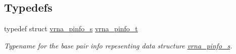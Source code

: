 \subsection*{Typedefs}
\begin{DoxyCompactItemize}
\item 
\mbox{\label{group__aln__utils_ga6660dfca23debee7306e0cd53341263f}} 
typedef struct \mbox{\hyperlink{group__aln__utils_structvrna__pinfo__s}{vrna\+\_\+pinfo\+\_\+s}} \mbox{\hyperlink{group__aln__utils_ga6660dfca23debee7306e0cd53341263f}{vrna\+\_\+pinfo\+\_\+t}}
\begin{DoxyCompactList}\small\item\em Typename for the base pair info repesenting data structure \mbox{\hyperlink{group__aln__utils_structvrna__pinfo__s}{vrna\+\_\+pinfo\+\_\+s}}. \end{DoxyCompactList}\end{DoxyCompactItemize}
